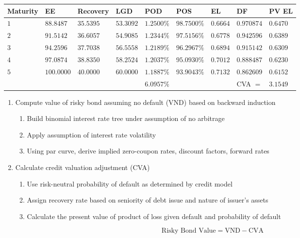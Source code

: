 \begin{flushleft}
\begin{tabularx}{\textwidth}{p{4em}|p{4em}|p{4em}|p{4em}|p{4em}|p{4em}|p{4em}|p{4em}|X}
\hline
\rowcolor{gray!30}
Maturity & EE & Recovery & LGD & POD & POS & EL & DF & PV EL \\
\hline
$1$ & $88.8487$ & $35.5395$ & $53.3092$ & $1.2500\%$ & $98.7500\%$ & $0.6664$ & $0.970874$ & $0.6470$ \\
$2$ & $91.5142$ & $36.6057$ & $54.9085$ & $1.2344\%$ & $97.5156\%$ & $0.6778$ & $0.942596$ & $0.6389$ \\
$3$ & $94.2596$ & $37.7038$ & $56.5558$ & $1.2189\%$ & $96.2967\%$ & $0.6894$ & $0.915142$ & $0.6309$ \\
$4$ & $97.0874$ & $38.8350$ & $58.2524$ & $1.2037\%$ & $95.0930\%$ & $0.7012$ & $0.888487$ & $0.6230$ \\
$5$ & $100.0000$ & $40.0000$ & $60.0000$ & $1.1887\%$ & $93.9043\%$ & $0.7132$ & $0.862609$ & $0.6152$ \\
& & & & $6.0957\%$ & & & CVA $=$ & $3.1549$ \\
\hline
\end{tabularx}
\end{flushleft}

\begin{method} 
\begin{enumerate}[label=\roman*.]
\setlength{\itemsep}{0pt}
\item Compute value of risky bond assuming no default (VND) based on backward induction
\begin{enumerate}[label=\arabic*.]
\setlength{\itemsep}{0pt}
\item Build binomial interest rate tree under assumption of no arbitrage
\item Apply assumption of interest rate volatility
\item Using par curve, derive implied zero-coupon rates, discount factors, forward rates
\end{enumerate}
\item Calculate credit valuation adjustment (CVA)
\begin{enumerate}[label=\arabic*.]
\setlength{\itemsep}{0pt}
\item Use risk-neutral probability of default as determined by credit model
\item Assign recovery rate based on seniority of debt issue and nature of issuer's assets
\item Calculate the present value of product of loss given default and probability of default
\end{enumerate}
\end{enumerate}
\begin{equation}
\text{Risky Bond Value} = \text{VND} - \text{CVA} \nonumber
\end{equation}
\end{method}
